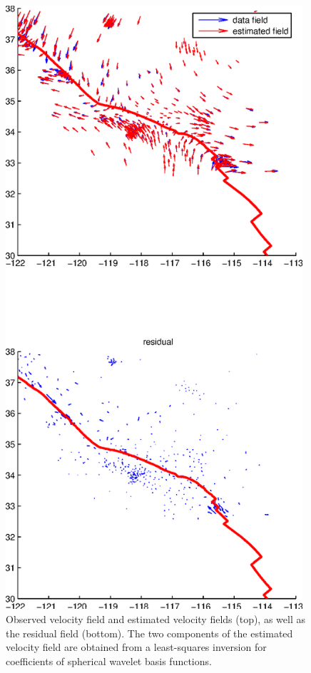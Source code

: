 \documentclass[11pt,titlepage,fleqn]{article}
\begin{document}
\begin{figure}
\includegraphics[width=11cm]{fig2D_B03.eps}
\caption[]
{{
Observed velocity field and estimated velocity fields (top), as well as the residual field (bottom). The two components of the estimated velocity field are obtained from a least-squares inversion for coefficients of spherical wavelet basis functions.
\label{fig:2D_B03}
}}
\end{figure}
\end{document}
